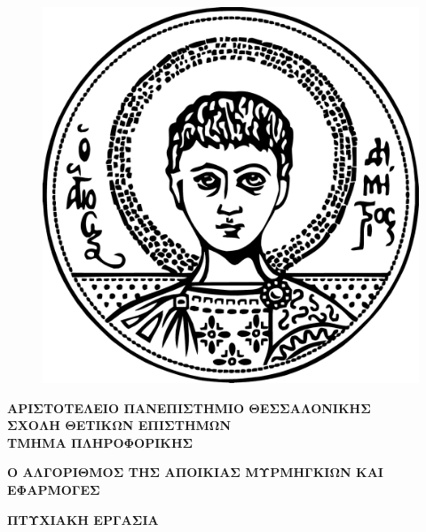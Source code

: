 \begin{figure}[h] %
\vspace*{-1cm}
\centering
\includegraphics[scale=0.35]{pictures/AUThLogo.png}
\end{figure}

\begin{center}
 { \large \bf ΑΡΙΣΤΟΤΕΛΕΙΟ ΠΑΝΕΠΙΣΤΗΜΙΟ ΘΕΣΣΑΛΟΝΙΚΗΣ
  \\ ΣΧΟΛΗ ΘΕΤΙΚΩΝ ΕΠΙΣΤΗΜΩΝ 
   \\ΤΜΗΜΑ ΠΛΗΡΟΦΟΡΙΚΗΣ
    \\}
\vspace{2cm}

{\large \bf Ο ΑΛΓΟΡΙΘΜΟΣ ΤΗΣ ΑΠΟΙΚΙΑΣ ΜΥΡΜΗΓΚΙΩΝ ΚΑΙ ΕΦΑΡΜΟΓΕΣ}
    
\vspace{2.5cm}

{\large \bf ΠΤΥΧΙΑΚΗ ΕΡΓΑΣΙΑ
\\ 
  \\}
  
  \vspace{2cm}
  
  {}
\end{center}